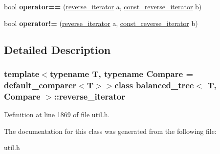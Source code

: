 \begin{DoxyCompactItemize}
\item 
\hypertarget{classbalanced__tree_1_1reverse__iterator_ab9ecb25f9569746510eaf39997a8a29a}{bool {\bfseries operator==} (\hyperlink{classbalanced__tree_1_1reverse__iterator}{reverse\+\_\+iterator} a, \hyperlink{classbalanced__tree_1_1const__reverse__iterator}{const\+\_\+reverse\+\_\+iterator} b)}\label{classbalanced__tree_1_1reverse__iterator_ab9ecb25f9569746510eaf39997a8a29a}

\item 
\hypertarget{classbalanced__tree_1_1reverse__iterator_aeb6854227a02ccdf01fc26d255eabf00}{bool {\bfseries operator!=} (\hyperlink{classbalanced__tree_1_1reverse__iterator}{reverse\+\_\+iterator} a, \hyperlink{classbalanced__tree_1_1const__reverse__iterator}{const\+\_\+reverse\+\_\+iterator} b)}\label{classbalanced__tree_1_1reverse__iterator_aeb6854227a02ccdf01fc26d255eabf00}

\end{DoxyCompactItemize}


\subsection{Detailed Description}
\subsubsection*{template$<$typename T, typename Compare = default\+\_\+comparer$<$\+T$>$$>$class balanced\+\_\+tree$<$ T, Compare $>$\+::reverse\+\_\+iterator}



Definition at line 1869 of file util.\+h.



The documentation for this class was generated from the following file\+:\begin{DoxyCompactItemize}
\item 
util.\+h\end{DoxyCompactItemize}
